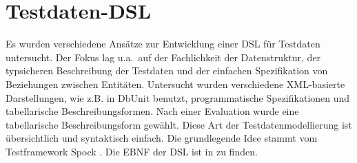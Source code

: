 \section{Testdaten-DSL}


%
%

Es wurden verschiedene Ansätze zur Entwicklung einer DSL für Testdaten untersucht. Der Fokus lag u.a.~auf der Fachlichkeit der Datenstruktur, der typsicheren Beschreibung der Testdaten und der einfachen Spezifikation von Beziehungen zwischen Entitäten. Untersucht wurden verschiedene XML-basierte Darstellungen, wie z.B. in DbUnit benutzt, programmatische Spezifikationen und  tabellarische Beschreibungsformen. 
%
Nach einer Evaluation wurde eine tabellarische Beschreibungsform gewählt.
%
%
Diese Art der Testdatenmodellierung ist übersichtlich und  syntaktisch einfach. Die grundlegende Idee 
%
%
stammt vom Testframework Spock \cite{Spock}.
%
Die EBNF der DSL ist in \cite{MT:Moll:2013} zu finden.



